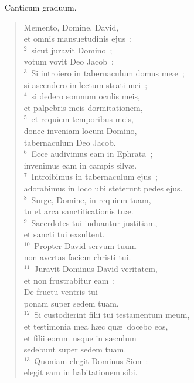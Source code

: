 ~\lettrine[lines=10,image=true,loversize=0.05,lraise=-0.03]{C}{}anticum graduum. \begin{flushleft}\begin{verse}\vspace{6pt}Memento, Domine, David,\\ et omnis mansuetudinis ejus~:\\
${}^{2}$~sicut juravit Domino~;\\ votum vovit Deo Jacob~:\\
${}^{3}$~Si introiero in tabernaculum domus me\ae~;\\ si ascendero in lectum strati mei~;\\
${}^{4}$~si dedero somnum oculis meis,\\ et palpebris meis dormitationem,\\
${}^{5}$~et requiem temporibus meis,\\ donec inveniam locum Domino,\\ tabernaculum Deo Jacob.\\
${}^{6}$~Ecce audivimus eam in Ephrata~;\\ invenimus eam in campis silv\ae .\\
${}^{7}$~Introibimus in tabernaculum ejus~;\\ adorabimus in loco ubi steterunt pedes ejus.\\
${}^{8}$~Surge, Domine, in requiem tuam,\\ tu et arca sanctificationis tu\ae .\\
${}^{9}$~Sacerdotes tui induantur justitiam,\\ et sancti tui exsultent.\\
${}^{10}$~Propter David servum tuum\\ non avertas faciem christi tui.\\
${}^{11}$~Juravit Dominus David veritatem,\\ et non frustrabitur eam~:\\ De fructu ventris tui\\ ponam super sedem tuam.\\
${}^{12}$~Si custodierint filii tui testamentum meum,\\ et testimonia mea h\ae c qu\ae\ docebo eos,\\ et filii eorum usque in s\ae culum\\ sedebunt super sedem tuam.\\
${}^{13}$~Quoniam elegit Dominus Sion~:\\ elegit eam in habitationem sibi.\\

\end{verse}
\end{flushleft}
